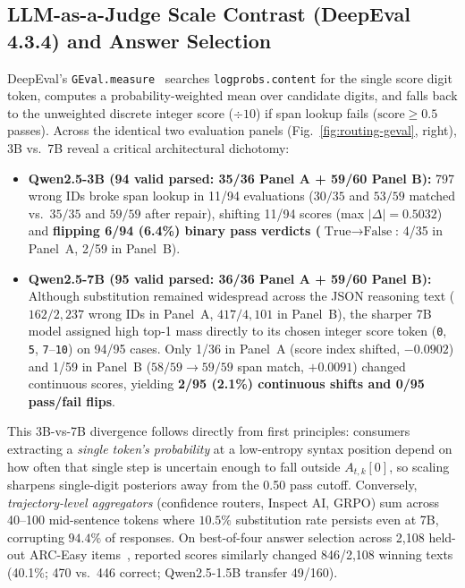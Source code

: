 \documentclass[11pt,letterpaper]{article}
\begin{document}
\subsection{LLM-as-a-Judge Scale Contrast (DeepEval 4.3.4) and Answer Selection}
DeepEval's \texttt{GEval.measure}~\cite{liu2023geval,gevalpkg} searches \texttt{logprobs.content} for the single score digit token, computes a probability-weighted mean over candidate digits, and falls back to the unweighted discrete integer score ($\div 10$) if span lookup fails ($\text{score}\ge 0.5$ passes). Across the identical two evaluation panels (Fig.~\ref{fig:routing-geval}, right), 3B vs.\ 7B reveal a critical architectural dichotomy:
\begin{itemize}
\item \textbf{Qwen2.5-3B (94 valid parsed: 35/36 Panel A + 59/60 Panel B):} 797 wrong IDs broke span lookup in 11/94 evaluations ($30/35$ and $53/59$ matched vs.\ $35/35$ and $59/59$ after repair), shifting 11/94 scores (max $|\Delta|=0.5032$) and \textbf{flipping 6/94 (6.4\%) binary pass verdicts ($\text{True}\to\text{False}$}: 4/35 in Panel~A, 2/59 in Panel~B).
\item \textbf{Qwen2.5-7B (95 valid parsed: 36/36 Panel A + 59/60 Panel B):} Although substitution remained widespread across the JSON reasoning text ($162/2{,}237$ wrong IDs in Panel~A, $417/4{,}101$ in Panel~B), the sharper 7B model assigned high top-1 mass directly to its chosen integer score token (\texttt{0}, \texttt{5}, \texttt{7}--\texttt{10}) on 94/95 cases. Only 1/36 in Panel~A (score index shifted, $-0.0902$) and 1/59 in Panel~B ($58/59\to 59/59$ span match, $+0.0091$) changed continuous scores, yielding \textbf{2/95 (2.1\%) continuous shifts and 0/95 pass/fail flips}.
\end{itemize}
This 3B-vs-7B divergence follows directly from first principles: consumers extracting a \emph{single token's probability} at a low-entropy syntax position depend on how often that single step is uncertain enough to fall outside $A_{t,k}[0]$, so scaling sharpens single-digit posteriors away from the 0.50 pass cutoff. Conversely, \emph{trajectory-level aggregators} (confidence routers, Inspect AI, GRPO) sum across 40--100 mid-sentence tokens where $10.5\%$ substitution rate persists even at 7B, corrupting $94.4\%$ of responses. On best-of-four answer selection across 2,108 held-out ARC-Easy items~\cite{arc}, reported scores similarly changed 846/2,108 winning texts (40.1\%; 470 vs.\ 446 correct; Qwen2.5-1.5B transfer 49/160).
\end{document}
